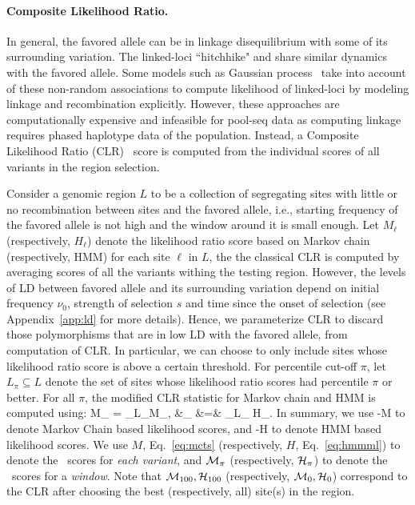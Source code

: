 \paragraph{Composite Likelihood Ratio.}
In general, the favored allele can be in linkage disequilibrium with some of
its surrounding variation. The linked-loci ``hitchhike" and share similar 
dynamics with the favored allele.
Some models such as Gaussian process~\cite{Terhorst2015Multi} take into account 
of these non-random associations to compute likelihood of linked-loci by 
modeling linkage and recombination explicitly. However, these approaches are 
computationally 
expensive and infeasible for pool-seq data as computing linkage 
requires phased haplotype data of the population.
Instead, a Composite Likelihood Ratio 
(CLR)~\cite{nielsen2005genomic,williamson2007localizing} score is computed from 
the individual scores of all variants in the region selection.


Consider a genomic region $L$ to be a collection of segregating sites with 
little or no recombination between sites and the favored allele, i.e., starting 
frequency of the favored allele is not high and the window around it is small 
enough. 
Let $M_\ell$ (respectively, $H_\ell$) denote the likelihood ratio
score based on Markov chain (respectively, HMM) for each site $\ell$
in $L$, the the classical CLR is computed by averaging scores of all the 
variants withing the testing region.
However, the levels of LD between favored allele and its surrounding variation 
depend on initial frequency $\nu_0$, strength of selection $s$ and time since 
the onset of selection (see Appendix~\ref{app:ld} for more details).
Hence, we parameterize CLR to discard those polymorphisms that are in low LD 
with the favored allele, from computation of CLR.
In particular, we can choose to only include sites whose likelihood ratio
score is above a certain threshold. For percentile cut-off $\pi$, let
$L_{\pi}\subseteq L$ denote the set of sites whose likelihood ratio
scores had percentile $\pi$ or better. For all $\pi$, the modified CLR
statistic for Markov chain and HMM is computed using:
\beq
  {\cal M}_{\pi} = \sum_{\ell \in L_{\pi}}M_\ell,
  &\hspace{0.5in}{\cal H}_{\pi} &=& \sum_{\ell \in L_{\pi}} 
  H_\ell.
  \label{eq:pihmm}
\eeq
In summary, we use \comale-M to denote Markov Chain based likelihood
scores, and \comale-H to denote HMM based likelihood scores. We use
$M$, Eq.~\ref{eq:mcts} (respectively, $H$, Eq.~\ref{eq:hmmml}) to
denote the \comale\ scores for \emph{each variant}, and ${\cal M}_{\pi}$
(respectively, ${\cal H}_{\pi}$) to denote the \comale\ scores for a
\emph{window}. Note that ${\cal M}_{100},{\cal H}_{100}$ (respectively,
${\cal M}_0,{\cal H}_0$) correspond to the CLR after choosing the best
(respectively, all) site(s) in the region. 

